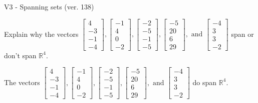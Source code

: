 \begin{exercise}
  \begin{exerciseTitle}V3 - Spanning sets (ver. 138)\end{exerciseTitle}
  \begin{exerciseStatement}
    Explain why the vectors \(\left[\begin{array}{r}
4 \\
-3 \\
-1 \\
-4
\end{array}\right] , \left[\begin{array}{r}
-1 \\
4 \\
0 \\
-2
\end{array}\right] , \left[\begin{array}{r}
-2 \\
-5 \\
-1 \\
-5
\end{array}\right] , \left[\begin{array}{r}
-5 \\
20 \\
6 \\
29
\end{array}\right] , \text{ and } \left[\begin{array}{r}
-4 \\
3 \\
3 \\
-2
\end{array}\right]\) span or don't span \(\mathbb{R}^4\). 
	


  \end{exerciseStatement}
  \begin{exerciseAnswer}
   The vectors \(\left[\begin{array}{r}
4 \\
-3 \\
-1 \\
-4
\end{array}\right] , \left[\begin{array}{r}
-1 \\
4 \\
0 \\
-2
\end{array}\right] , \left[\begin{array}{r}
-2 \\
-5 \\
-1 \\
-5
\end{array}\right] , \left[\begin{array}{r}
-5 \\
20 \\
6 \\
29
\end{array}\right] , \text{ and } \left[\begin{array}{r}
-4 \\
3 \\
3 \\
-2
\end{array}\right]\) 
  	 do  
	span \(\mathbb{R}^4\).
  



\end{exerciseAnswer}
\end{exercise}
